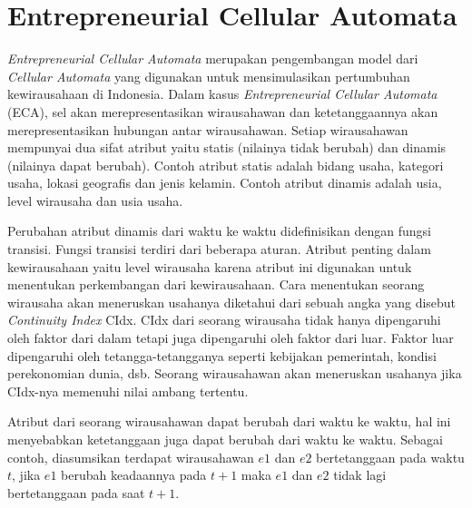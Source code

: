 \section{Entrepreneurial Cellular Automata}
\label{sec:ECA}
\textit{Entrepreneurial Cellular Automata} merupakan pengembangan model dari \textit{Cellular Automata} yang digunakan untuk mensimulasikan pertumbuhan kewirausahaan di Indonesia. Dalam kasus \textit{Entrepreneurial Cellular Automata} (ECA), sel akan merepresentasikan wirausahawan dan ketetanggaannya akan merepresentasikan hubungan antar wirausahawan. Setiap wirausahawan mempunyai dua sifat atribut yaitu statis (nilainya tidak berubah) dan dinamis (nilainya dapat berubah). Contoh atribut statis adalah bidang usaha, kategori usaha, lokasi geografis dan jenis kelamin. Contoh atribut dinamis adalah usia, level wirausaha dan usia usaha.  

Perubahan atribut dinamis dari waktu ke waktu didefinisikan dengan fungsi transisi. Fungsi transisi terdiri dari beberapa aturan. Atribut penting dalam kewirausahaan yaitu level wirausaha karena atribut ini digunakan untuk menentukan perkembangan dari kewirausahaan. Cara menentukan seorang wirausaha akan meneruskan usahanya diketahui dari sebuah angka yang disebut \textit{Continuity Index} CIdx. CIdx dari seorang wirausaha tidak hanya dipengaruhi oleh faktor dari dalam tetapi juga dipengaruhi oleh faktor dari luar. Faktor luar dipengaruhi oleh tetangga-tetangganya seperti kebijakan pemerintah, kondisi perekonomian dunia, dsb. Seorang wirausahawan akan meneruskan usahanya jika CIdx-nya memenuhi nilai ambang tertentu.

Atribut dari seorang wirausahawan dapat berubah dari waktu ke waktu, hal ini menyebabkan ketetanggaan juga dapat berubah dari waktu ke waktu. Sebagai contoh, diasumsikan terdapat wirausahawan $e1$ dan $e2$ bertetanggaan pada waktu $t$, jika $e1$ berubah keadaannya pada $t+1$ maka $e1$ dan $e2$ tidak lagi bertetanggaan pada saat $t+1$.

